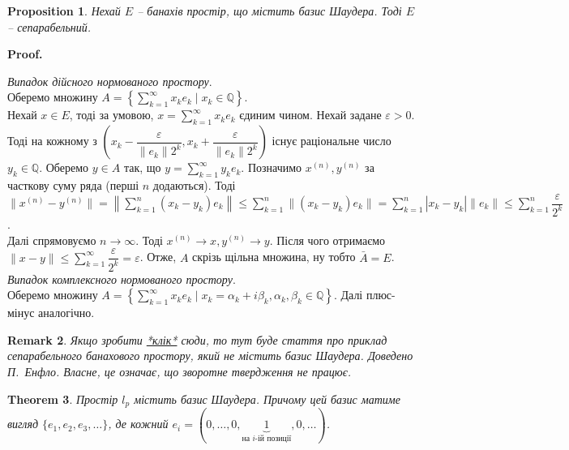 \documentclass[a4paper, 10pt]{article}
\makeatletter
\theoremstyle{theoremdd}
\newtheorem{theorem}{Theorem}[subsection]
\theoremstyle{theoremdd}
\theoremstyle{theoremdd}
\theoremstyle{theoremdd}
\theoremstyle{theoremdd}
\newtheorem{proposition}[theorem]{Proposition}
\theoremstyle{theoremdd}
\newtheorem{remark}[theorem]{Remark}
\theoremstyle{theoremdd}
\theoremstyle{theoremdd}
\renewenvironment{proof}[1][Proof.\\]{\par
\pushQED{\hfill \qed}%
\normalfont \topsep6\p@\@plus6\p@\relax
\trivlist
\item\relax
{\bfseries
#1\@addpunct{.}}\hspace\labelsep\ignorespaces
}{%
\popQED\endtrivlist\@endpefalse
}
\makeatother
\begin{document}
\begin{proposition}
Нехай $E$ -- банахів простір, що містить базис Шаудера. Тоді $E$ -- сепарабельний.
\end{proposition}

\begin{proof}
\textit{Випадок дійсного нормованого простору}.\\
Оберемо множину $A = \left\{ \displaystyle\sum_{k=1}^\infty x_k e_k \mid x_k \in \mathbb{Q} \right\}$.\\
Нехай $x \in E$, тоді за умовою, $x = \displaystyle\sum_{k=1}^\infty x_k e_k$ єдиним чином. Нехай задане $\varepsilon > 0$. Тоді на кожному з $\left(x_k-\dfrac{\varepsilon}{\|e_k\| 2^k},x_k + \dfrac{\varepsilon}{\|e_k\| 2^k} \right)$ існує раціональне число $y_k \in \mathbb{Q}$. Оберемо $y \in A$ так, що $y = \displaystyle\sum_{k=1}^\infty y_k e_k$. Позначимо $x^{(n)},y^{(n)}$ за часткову суму ряда (перші $n$ додаються). Тоді\\
$\|x^{(n)} - y^{(n)}\| = \displaystyle\left\| \sum_{k=1}^n (x_k-y_k) e_k \right\| \leq \sum_{k=1}^n \| (x_k-y_k) e_k \| = \sum_{k=1}^n |x_k-y_k| \|e_k\| \leq \sum_{k=1}^n \dfrac{\varepsilon}{2^k}$.\\
Далі спрямовуємо $n \to \infty$. Тоді $x^{(n)} \to x, y^{(n)} \to y$. Після чого отримаємо $\|x-y\| \displaystyle \leq \sum_{k=1}^\infty \dfrac{\varepsilon}{2^k} = \varepsilon$. Отже, $A$ скрізь щільна множина, ну тобто $\bar{A} = E$.
\bigskip \\
\textit{Випадок комплексного нормованого простору}.\\
Оберемо множину $A = \left\{ \displaystyle\sum_{k=1}^\infty x_k e_k \mid x_k = \alpha_k + i \beta_k, \alpha_k, \beta_k \in \mathbb{Q} \right\}$. Далі плюс-мінус аналогічно.
\end{proof}

\begin{remark}
Якщо зробити \textcolor{red}{\href{https://projecteuclid.org/download/pdf_1/euclid.acta/1485889774}{*клік*}} сюди, то тут буде стаття про приклад сепарабельного банахового простору, який не містить базис Шаудера. Доведено П.\ Енфло. Власне, це означає, що зворотне твердження не працює.
\end{remark}

\begin{theorem}
Простір $l_p$ містить базис Шаудера. Причому цей базис матиме вигляд $\{e_1,e_2,e_3,\dots\}$, де кожний $e_i = (0,\dots,0,\underbrace{1}_{\text{на $i$-ій позиції}},0,\dots)$.
\end{theorem}
\end{document}
